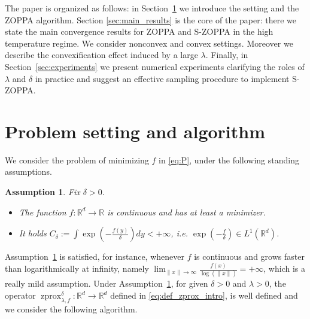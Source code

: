 \documentclass{article}
\newtheorem{assumption}{Assumption}[section]
\newcommand{\R}{\mathbb{R}}
\newcommand{\zprox}{\ensuremath{\operatorname{zprox}}}
\begin{document}
The paper is organized as follows: in Section~\ref{sec:setting} we introduce the setting and the ZOPPA algorithm. Section \ref{sec:main_results} is the core of the paper: there we state the main convergence results for ZOPPA and S-ZOPPA in the high temperature regime. We consider nonconvex and convex settings.  Moreover we describe the convexification effect induced by a large $\lambda$. Finally, in Section~\ref{sec:experiments} we present numerical experiments clarifying the roles of $\lambda$ and $\delta$ in practice and suggest an effective sampling procedure to implement S-ZOPPA. 
\section{Problem setting and algorithm }\label{sec:setting}
We consider the problem of minimizing $f$ in \eqref{eq:P}, under the following standing assumptions.
\begin{assumption}\label{ass:on_f} Fix $\delta>0$. 
    \begin{itemize} 
        \item [A1)] The function $f:\R^d \to \R$ is continuous and has at least a minimizer. 
        \item[A2)] It holds $C_\delta:=\int \exp\left(-\frac{f(y)}{\delta}\right) dy <+\infty$, i.e. $\exp\left(-\frac{f}{\delta}\right)\in L^1(\mathbb{R}^d)$.
    \end{itemize}
\end{assumption}
Assumption~\ref{ass:on_f} is satisfied, for instance, whenever \(f\) is continuous and grows faster than logarithmically at infinity, namely $\lim_{\|x\|\to\infty}\frac{f(x)}{\log(\|x\|)}=+\infty$, which is a really mild assumption. Under Assumption~\ref{ass:on_f}, for given $\delta>0$ and $\lambda>0$, the operator $\zprox_{\lambda,f}^\delta: \R^d \to \R^d$ defined in \eqref{eq:def_zprox_intro}, is well defined and we consider the following algorithm. 
\end{document}
